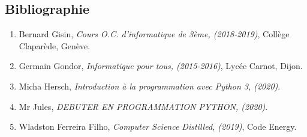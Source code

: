 \begin{appendix}
\chapter{Bibliographie}


\begin{enumerate}[label=\textbf{\arabic*}.]
\item  Bernard Gisin, \emph{Cours O.C. d'informatique de 3ème, (2018-2019)}, Collège Claparède, Genève.\\
\item  Germain Gondor, \emph{Informatique pour tous, (2015-2016)}, Lycée Carnot, Dijon.\\
\item  Micha Hersch, \emph{Introduction à la programmation avec Python 3, (2020)}.\\
\item  Mr Jules, \emph{DEBUTER EN PROGRAMMATION PYTHON, (2020)}.\\

\item  Wladston Ferreira Filho, \emph{Computer Science Distilled, (2019)}, Code Energy.\\
\end{enumerate}



\bigskip


\end{appendix}
\clearemptydoublepage %

